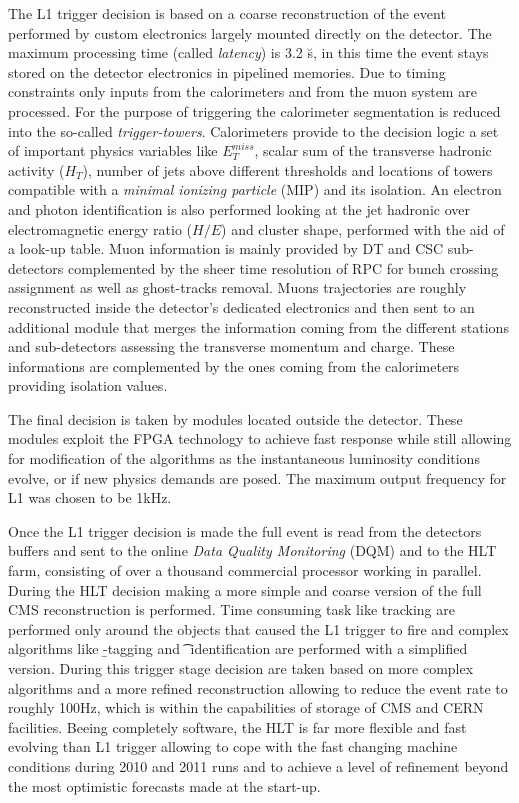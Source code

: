 The L1 trigger decision is based on a coarse reconstruction of the event performed by custom electronics largely mounted directly on the detector. The maximum processing time (called \emph{latency}) is 3.2 \u s, in this time the event stays stored on the detector electronics in pipelined memories. Due to timing constraints only inputs from the calorimeters and from the muon system are processed. For the purpose of triggering the calorimeter segmentation is reduced into the so-called \emph{trigger-towers}. Calorimeters provide to the decision logic a set of important physics variables like $E_T^{miss}$, scalar sum of the transverse hadronic activity ($H_T$), number of jets above different thresholds and locations of towers compatible with a \emph{minimal ionizing particle} (MIP) and its isolation. An electron and photon identification is also performed looking at the jet hadronic over electromagnetic energy ratio ($H/E$) and cluster shape, performed with the aid of a look-up table. Muon information is mainly provided by DT and CSC sub-detectors complemented by the sheer time resolution of RPC for bunch crossing assignment as well as ghost-tracks removal. Muons trajectories are roughly reconstructed inside the detector's dedicated electronics and then sent to an additional module that merges the information coming from the different stations and sub-detectors assessing the transverse momentum  and charge. These informations are complemented by the ones coming from the calorimeters providing isolation values.

The final decision is taken by modules located outside the detector. These modules exploit the FPGA technology to achieve fast response while still allowing for modification of the algorithms as the instantaneous luminosity conditions evolve, or if new physics demands are posed. The maximum output frequency for L1 was chosen to be 1kHz.

Once the L1 trigger decision is made the full event is read from the detectors buffers and sent to the online \emph{Data Quality Monitoring} (DQM) and to the HLT farm, consisting of over a thousand commercial processor working in parallel. During the HLT decision making a more simple and coarse version of the full CMS reconstruction is performed. Time consuming task like tracking are performed only around the objects that caused the L1 trigger to fire and complex algorithms like \b-tagging and \t~identification are performed with a simplified version. During this trigger stage decision are taken based on more complex algorithms and a more refined reconstruction allowing to reduce the event rate to roughly 100Hz, which is within the capabilities of storage of CMS and CERN facilities. Beeing completely software, the HLT is far more flexible and fast evolving than L1 trigger allowing to cope with the fast changing machine conditions during 2010 and 2011 runs and to achieve a level of refinement beyond the most optimistic forecasts made at the start-up.

